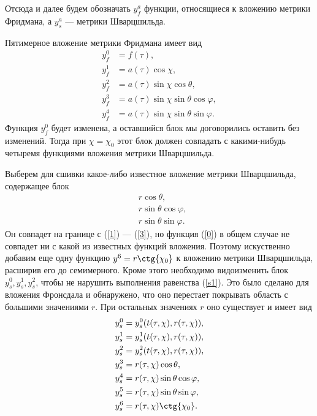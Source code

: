\documentclass[12pt]{article}
\begin{document}
Отсюда и далее будем обозначать $y^a_f$ функции, относящиеся к вложению метрики Фридмана, а $y^a_s$ --- метрики Шварцшильда.

Пятимерное вложение метрики Фридмана имеет вид
\begin{align}
	y^0_f &= f(\tau), \\
\label{0}	y^1_f &= a(\tau) \cos{\chi}, \\
\label{1}	y^2_f &= a(\tau) \sin{\chi} \cos{\theta}, \\
\label{2}	y^3_f &= a(\tau) \sin{\chi} \sin{\theta} \cos{\varphi}, \\
\label{3}	y^4_f &= a(\tau) \sin{\chi} \sin{\theta} \sin{\varphi}.
\end{align}
Функция $y^0_f$ будет изменена, а оставшийся блок мы договорились оставить без изменений. Тогда при $\chi = \chi_0$ этот блок должен совпадать с какими-нибудь четыремя функциями вложения метрики Шварцшильда. 

Выберем для сшивки какое-либо известное вложение метрики Шварцшильда, содержащее блок
\begin{align}
	&r \cos{\theta}, \\
	&r \sin{\theta} \cos{\varphi}, \\
	&r \sin{\theta} \sin{\varphi}.
\end{align}
Он совпадет на границе с (\ref{1}) --- (\ref{3}), но функция (\ref{0}) в общем случае не совпадет ни с какой из известных функций вложения. Поэтому искуственно добавим еще одну функцию $y^6 = r \ctg{\chi_0}$ к вложению метрики Шварцшильда, расширив его до семимерного. Кроме этого необходимо видоизменить блок $y^0_s, y^1_s, y^2_s$, чтобы не нарушить выполнения равенства (\ref{s1}). Это было сделано для вложения Фронсдала и обнаружено, что оно перестает покрывать область с большими значениями $r$. При остальных значениях $r$ оно существует и имеет вид
\begin{align}
\label{4}	&y^0_s = y^0_s(t(\tau, \chi), r(\tau, \chi)), \\
\label{5}	&y^1_s = y^1_s(t(\tau, \chi), r(\tau, \chi)), \\
\label{6}	&y^2_s = y^2_s(t(\tau, \chi), r(\tau, \chi)), \\
	&y^3_s = r(\tau, \chi) \cos{\theta}, \\
	&y^4_s = r(\tau, \chi) \sin{\theta} \cos{\varphi}, \\
	&y^5_s = r(\tau, \chi) \sin{\theta} \sin{\varphi}, \\
\label{7}	&y^6_s = r(\tau, \chi) \ctg{\chi_0}.
\end{align}
\end{document}

